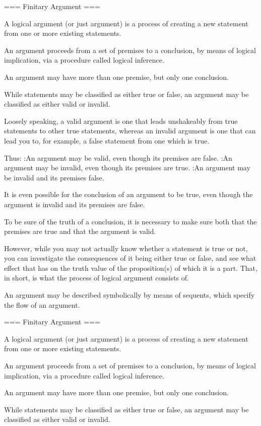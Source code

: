 === Finitary Argument ===

A logical argument (or just argument) is a process of creating a new statement from one or more existing statements.

An argument proceeds from a set of premises to a conclusion, by means of logical implication, via a procedure called logical inference.


An argument may have more than one premise, but only one conclusion.


While statements may be classified as either true or false, an argument may be classified as either valid or invalid.


Loosely speaking, a valid argument is one that leads unshakeably from true statements to other true statements, whereas an invalid argument is one that can lead you to, for example, a false statement from one which is true.


Thus:
:An argument may be valid, even though its premises are false.
:An argument may be invalid, even though its premises are true.
:An argument may be invalid and its premises false.

It is even possible for the conclusion of an argument to be true, even though the argument is invalid and its premises are false.


To be sure of the truth of a conclusion, it is necessary to make sure both that the premises are true and that the argument is valid.


However, while you may not actually know whether a statement is true or not, you can investigate the consequences of it being either true or false, and see what effect that has on the truth value of the proposition(s) of which it is a part. That, in short, is what the process of logical argument consists of.


An argument may be described symbolically by means of sequents, which specify the flow of an argument.


=== Finitary Argument ===

A logical argument (or just argument) is a process of creating a new statement from one or more existing statements.

An argument proceeds from a set of premises to a conclusion, by means of logical implication, via a procedure called logical inference.


An argument may have more than one premise, but only one conclusion.


While statements may be classified as either true or false, an argument may be classified as either valid or invalid.



